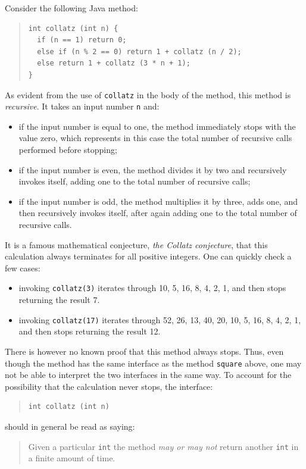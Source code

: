 \documentclass{article}
\theoremstyle{remark}
\begin{document}
Consider the following Java method:
\begin{quote}
\begin{verbatim}
int collatz (int n) {
  if (n == 1) return 0; 
  else if (n % 2 == 0) return 1 + collatz (n / 2);
  else return 1 + collatz (3 * n + 1);
}
\end{verbatim}
\end{quote}
As evident from the use of \verb|collatz| in the body of the method, this
method is \emph{recursive}. It takes an input number \verb|n| and:
\begin{itemize}
\item if the input number is equal to one, the method immediately stops with
the value zero, which represents in this case the total number of recursive
calls performed before stopping;
\item if the input number is even, the method divides it by two and
recursively invokes itself, adding one to the total number of recursive
calls;
\item if the input number is odd, the method multiplies it by three, adds
one, and then recursively invokes itself, after again adding one to the total
number of recursive calls.
\end{itemize}
It is a famous mathematical conjecture, \emph{the Collatz conjecture}, that
this calculation always terminates for all positive integers. One can quickly
check a few cases:
\begin{itemize}
\item invoking \verb|collatz(3)| iterates through 10, 5, 16, 8, 4, 2, 1, and
  then stops returning the result 7.
\item invoking \verb|collatz(17)| iterates through 52, 26, 13, 40, 20, 10, 5,
16, 8, 4, 2, 1, and then stops returning the result 12.
\end{itemize}

There is however no known proof that this method always stops. Thus, even
though the method has the same interface as the method \verb|square| above,
one may not be able to interpret the two interfaces in the same way. To
account for the possibility that the calculation never stops, the interface:
\begin{quote}
\begin{verbatim}
int collatz (int n)
\end{verbatim}
\end{quote}
should in general be read as saying:
\begin{quote}
Given a particular \verb|int| the method \emph{may or may not} return another
\verb|int| in a finite amount of time.
\end{quote}
\end{document}
